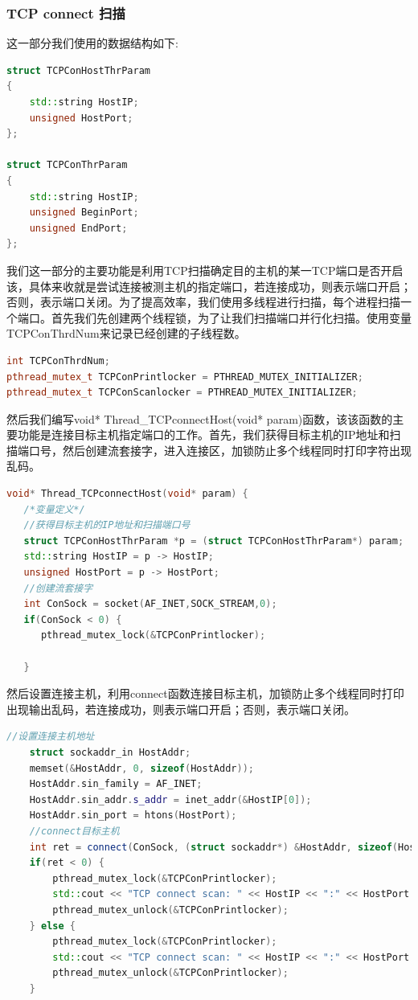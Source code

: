 \documentclass[UTF8,a4paper,10pt]{ctexart}
\begin{document}
\subsubsection{TCP connect 扫描}
这一部分我们使用的数据结构如下:
\begin{lstlisting}[language = C++]
struct TCPConHostThrParam
{
	std::string HostIP;
	unsigned HostPort;
};

struct TCPConThrParam
{
	std::string HostIP;
	unsigned BeginPort;
	unsigned EndPort;
};
\end{lstlisting}
我们这一部分的主要功能是利用TCP扫描确定目的主机的某一TCP端口是否开启该，具体来收就是尝试连接被测主机的指定端口，若连接成功，则表示端口开启；否则，表示端口关闭。为了提高效率，我们使用多线程进行扫描，每个进程扫描一个端口。首先我们先创建两个线程锁，为了让我们扫描端口并行化扫描。使用变量 TCPConThrdNum来记录已经创建的子线程数。
\begin{lstlisting}[language = C++]
int TCPConThrdNum;
pthread_mutex_t TCPConPrintlocker = PTHREAD_MUTEX_INITIALIZER;
pthread_mutex_t TCPConScanlocker = PTHREAD_MUTEX_INITIALIZER;
\end{lstlisting}
然后我们编写void* Thread\_TCPconnectHost(void* param)函数，该该函数的主要功能是连接目标主机指定端口的工作。首先，我们获得目标主机的IP地址和扫描端口号，然后创建流套接字，进入连接区，加锁防止多个线程同时打印字符出现乱码。
\begin{lstlisting}[language = C++]
void* Thread_TCPconnectHost(void* param) {
   /*变量定义*/
   //获得目标主机的IP地址和扫描端口号
   struct TCPConHostThrParam *p = (struct TCPConHostThrParam*) param;
   std::string HostIP = p -> HostIP;
   unsigned HostPort = p -> HostPort;
   //创建流套接字
   int ConSock = socket(AF_INET,SOCK_STREAM,0);
   if(ConSock < 0) {
      pthread_mutex_lock(&TCPConPrintlocker);

   }
\end{lstlisting}
然后设置连接主机，利用connect函数连接目标主机，加锁防止多个线程同时打印出现输出乱码，若连接成功，则表示端口开启；否则，表示端口关闭。
\begin{lstlisting}[language = C++]
   //设置连接主机地址
    struct sockaddr_in HostAddr;
    memset(&HostAddr, 0, sizeof(HostAddr));
    HostAddr.sin_family = AF_INET;
    HostAddr.sin_addr.s_addr = inet_addr(&HostIP[0]);
    HostAddr.sin_port = htons(HostPort);
    //connect目标主机
    int ret = connect(ConSock, (struct sockaddr*) &HostAddr, sizeof(HostAddr));
    if(ret < 0) {
        pthread_mutex_lock(&TCPConPrintlocker);
        std::cout << "TCP connect scan: " << HostIP << ":" << HostPort << " is closed" << std::endl;
        pthread_mutex_unlock(&TCPConPrintlocker);
    } else {
        pthread_mutex_lock(&TCPConPrintlocker);
        std::cout << "TCP connect scan: " << HostIP << ":" << HostPort << " is open" << std::endl;
        pthread_mutex_unlock(&TCPConPrintlocker);
    }
\end{lstlisting}
\end{document}
